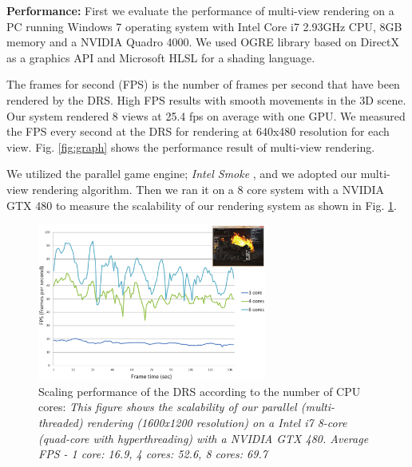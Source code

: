 \documentclass[conference]{IEEEtran}
\begin{document}
    \noindent
    \textbf{Performance:}
    First we evaluate the performance of multi-view rendering on a PC running Windows 7 operating system with Intel Core i7 2.93GHz CPU, 8GB memory and a NVIDIA Quadro 4000. We used OGRE library based on DirectX as a graphics API and Microsoft HLSL for a shading language.

    The frames for second (FPS) is the number of frames per second that have been rendered by the DRS.
    High FPS results with smooth movements in the 3D scene.
    Our system rendered 8 views at 25.4 fps on average with one GPU.
    We measured the FPS every second at the DRS for rendering at 640x480 resolution for each view.
    Fig. \ref{fig:graph} shows the performance result of multi-view rendering.

    We utilized the parallel game engine; \emph{Intel Smoke} \cite{Smoke:2009}, and we adopted our multi-view rendering algorithm.
    Then we ran it on a 8 core system with a NVIDIA GTX 480 to measure the scalability of our rendering system as shown in Fig. \ref{fig:scaling}.
    \begin{figure}[htb] %
    \centering
    \includegraphics[width=7.51cm,keepaspectratio]{scalinggraph}
    \caption{Scaling performance of the DRS according to the number of CPU cores: \emph{This figure shows the scalability of our parallel (multi-threaded) rendering (1600x1200 resolution) on a Intel i7 8-core
    (quad-core with hyperthreading)
    with a NVIDIA GTX 480. Average FPS - 1 core: 16.9, 4 cores: 52.6, 8 cores: 69.7 }}
    \label{fig:scaling}
    \end{figure}
\end{document}
